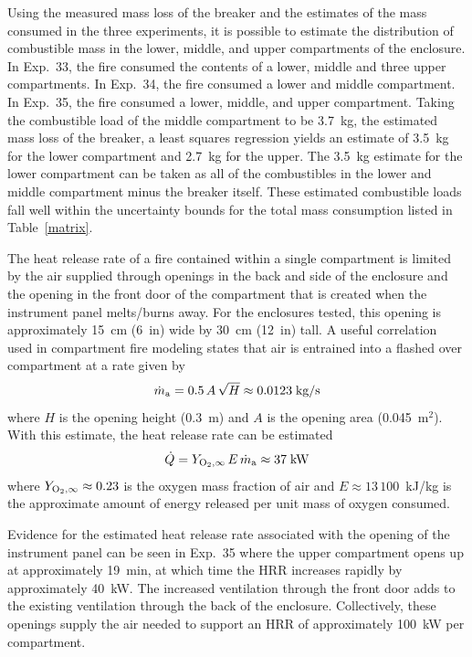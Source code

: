 Using the measured mass loss of the breaker and the estimates of the mass consumed in the three experiments, it is possible to estimate the distribution of combustible mass in the lower, middle, and upper compartments of the enclosure. In Exp.~33, the fire consumed the contents of a lower, middle and three upper compartments. In Exp.~34, the fire consumed a lower and middle compartment. In Exp.~35, the fire consumed a lower, middle, and upper compartment. Taking the combustible load of the middle compartment to be 3.7~kg, the estimated mass loss of the breaker, a least squares regression yields an estimate of 3.5~kg for the lower compartment and 2.7~kg for the upper. The 3.5~kg estimate for the lower compartment can be taken as all of the combustibles in the lower and middle compartment minus the breaker itself. These estimated combustible loads fall well within the uncertainty bounds for the total mass consumption listed in Table~\ref{matrix}.

The heat release rate of a fire contained within a single compartment is limited by the air supplied through openings in the back and side of the enclosure and the opening in the front door of the compartment that is created when the instrument panel melts/burns away. For the enclosures tested, this opening is approximately 15~cm (6~in) wide by 30~cm (12~in) tall. A useful correlation~\cite{SFPE:Walton} used in compartment fire modeling states that air is entrained into a flashed over compartment at a rate given by
\begin{equation}
   \dot{m}_{\rm a} = 0.5  \, A \, \sqrt{H}  \approx 0.0123 \; \hbox{kg/s}
\end{equation}
where $H$ is the opening height (0.3~m) and $A$ is the opening area (0.045~m$^2$). With this estimate, the heat release rate can be estimated
\begin{equation}
   \dot{Q} = Y_{\rm O_2,\infty} \, E \, \dot{m}_{\rm a} \approx 37 \; \hbox{kW}
\end{equation}
where $Y_{\rm O_2,\infty}\approx 0.23$ is the oxygen mass fraction of air and $E\approx 13\,100$~kJ/kg is the approximate amount of energy released per unit mass of oxygen consumed.

Evidence for the estimated heat release rate associated with the opening of the instrument panel can be seen in Exp.~35 where the upper compartment opens up at approximately 19~min, at which time the HRR increases rapidly by approximately 40~kW. The increased ventilation through the front door adds to the existing ventilation through the back of the enclosure. Collectively, these openings supply the air needed to support an HRR of approximately 100~kW per compartment.


